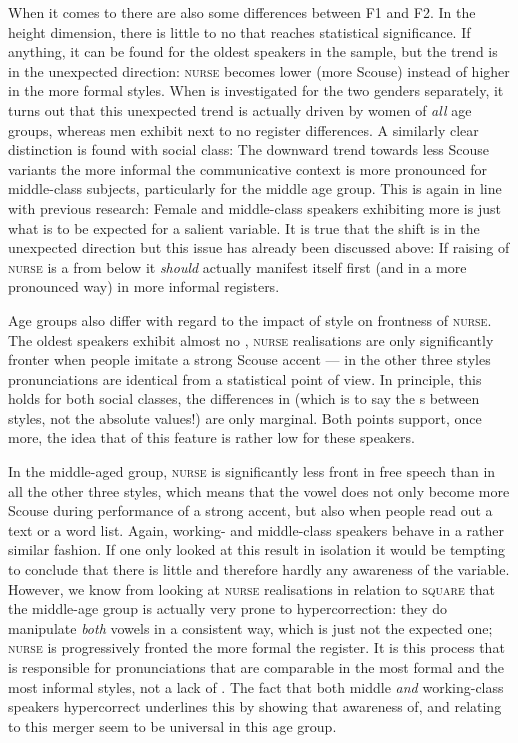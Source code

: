 When it comes to  there are also some differences between F1 and F2.
In the height dimension, there is little to no  that reaches statistical significance.
If anything, it can be found for the oldest speakers in the sample, but the trend is in the unexpected direction: \textsc{nurse} becomes lower (more Scouse) instead of higher in the more formal styles.
When  is investigated for the two genders separately, it turns out that this unexpected trend is actually driven by women of \emph{all} age groups, whereas men exhibit next to no register differences.
A similarly clear distinction is found with social class: The downward trend towards less Scouse variants the more informal the communicative context is more pronounced for middle-class subjects, particularly for the middle age group.
This is again in line with previous research: Female and middle-class speakers exhibiting more  is just what is to be expected for a salient variable.
It is true that the shift is in the unexpected direction but this issue has already been discussed above: If raising of \textsc{nurse} is a  from below it \emph{should} actually manifest itself first (and in a more pronounced way) in more informal registers.

Age groups also differ with regard to the impact of style on frontness of \textsc{nurse}.
The oldest speakers exhibit almost no , \textsc{nurse} realisations are only significantly fronter when people imitate a strong Scouse accent --- in the other three styles pronunciations are identical from a statistical point of view.
In principle, this holds for both social classes, the differences in  (which is to say the s between styles, not the absolute values!) are only marginal.
Both points support, once more, the idea that  of this feature is rather low for these speakers.

In the middle-aged group, \textsc{nurse} is significantly less front in free speech than in all the other three styles, which means that the vowel does not only become more Scouse during performance of a strong accent, but also when people read out a text or a word list.
Again, working- and middle-class speakers behave in a rather similar fashion.
If one only looked at this result in isolation it would be tempting to conclude that there is little  and therefore hardly any awareness of the variable.
However, we know from looking at \textsc{nurse} realisations in relation to \textsc{square} that the middle-age group is actually very prone to hypercorrection: they do manipulate \emph{both} vowels in a consistent way, which is just not the expected one; \textsc{nurse} is progressively fronted the more formal the register.
It is this process that is responsible for pronunciations that are comparable in the most formal and the most informal styles, not a lack of .
The fact that both middle \emph{and} working-class speakers hypercorrect underlines this by showing that awareness of, and  relating to this merger seem to be universal in this age group.

